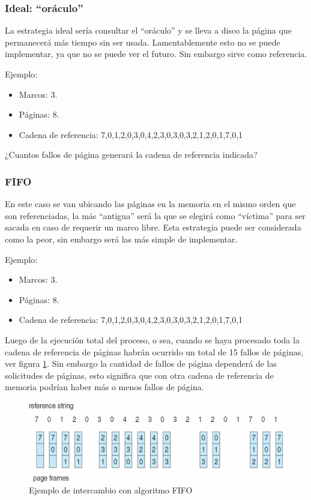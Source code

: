 
\subsubsection{Ideal: ``oráculo''}

La estrategia ideal sería consultar el ``oráculo'' y se lleva a disco la página
que permanecerá más tiempo sin ser usada. Lamentablemente esto no se puede
implementar, ya que no se puede ver el futuro. Sin embargo sirve como
referencia.

Ejemplo:
\begin{itemize}
	\item Marcos: 3.
	\item Páginas: 8.
	\item Cadena de referencia: 7,0,1,2,0,3,0,4,2,3,0,3,0,3,2,1,2,0,1,7,0,1
\end{itemize}

¿Cuantos fallos de página generará la cadena de referencia indicada?

\subsubsection{FIFO}
En este caso se van ubicando las páginas en la memoria en el mismo orden que son
referenciadas, la más ``antigua'' será la que se elegirá como ``víctima'' para
ser sacada en caso de requerir un marco libre. Esta estrategia puede ser
considerada como la peor, sin embargo será las más simple de implementar.

Ejemplo:
\begin{itemize}
	\item Marcos: 3.
	\item Páginas: 8.
	\item Cadena de referencia: 7,0,1,2,0,3,0,4,2,3,0,3,0,3,2,1,2,0,1,7,0,1
\end{itemize}

Luego de la ejecución total del proceso, o sea, cuando se haya procesado toda la
cadena de referencia de páginas habrán ocurrido un total de 15 fallos de
páginas, ver figura \ref{fig:swap_fifo}. Sin embargo la cantidad de fallos de
página dependerá de las solicitudes de páginas, esto significa que con otra
cadena de referencia de memoria podrían haber más o menos fallos de página.

\begin{figure}[htbp]
\centering
\includegraphics[scale=0.55]{img/C07_memoria/swap_fifo.png}
\caption{Ejemplo de intercambio con algoritmo FIFO}
\label{fig:swap_fifo}
\end{figure}

